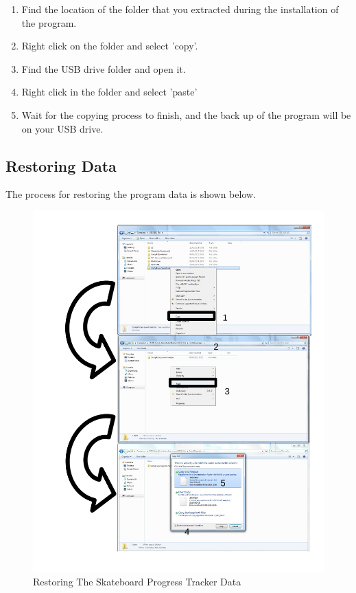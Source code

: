 \begin{enumerate}
\item Find the location of the folder that you extracted during the installation of the program.
\item Right click on the folder and select 'copy'.
\item Find the USB drive folder and open it.
\item Right click in the folder and select 'paste' 
\item Wait for the copying process to finish, and the back up of the program will be on your USB drive.
\end{enumerate}

\subsection{Restoring Data}

The process for restoring the program data is shown below.

\begin{figure}[H]
    \includegraphics[width=\textwidth]{./Manual/Images/RestoringData.pdf}
    \caption{Restoring The Skateboard Progress Tracker Data} \label{fig:Restoring Data}
\end{figure}

